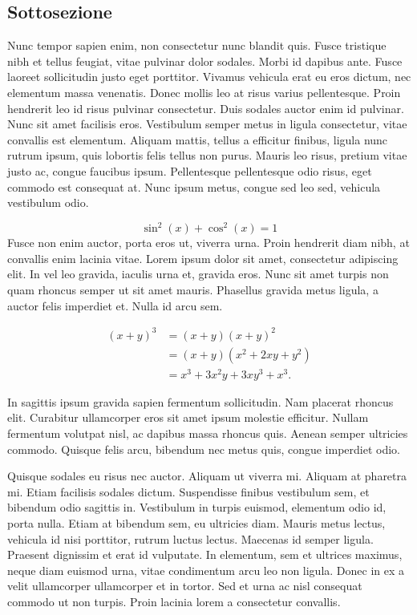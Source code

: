 \subsection{Sottosezione}
Nunc tempor sapien enim, non consectetur nunc blandit quis. Fusce tristique nibh et tellus feugiat, vitae pulvinar dolor sodales. Morbi id dapibus ante. Fusce laoreet sollicitudin justo eget porttitor. Vivamus vehicula erat eu eros dictum, nec elementum massa venenatis. Donec mollis leo at risus varius pellentesque. Proin hendrerit leo id risus pulvinar consectetur. Duis sodales auctor enim id pulvinar. Nunc sit amet facilisis eros. Vestibulum semper metus in ligula consectetur, vitae convallis est elementum. Aliquam mattis, tellus a efficitur finibus, ligula nunc rutrum ipsum, quis lobortis felis tellus non purus. Mauris leo risus, pretium vitae justo ac, congue faucibus ipsum. Pellentesque pellentesque odio risus, eget commodo est consequat at. Nunc ipsum metus, congue sed leo sed, vehicula vestibulum odio.

\begin{equation}\label{eq:fund_trigon_eq_1}
\sin^2(x) + \cos^2(x) = 1
\end{equation}
Fusce non enim auctor, porta eros ut, viverra urna. Proin hendrerit diam nibh, at convallis enim lacinia vitae. Lorem ipsum dolor sit amet, consectetur adipiscing elit. In vel leo gravida, iaculis urna et, gravida eros. Nunc sit amet turpis non quam rhoncus semper ut sit amet mauris. Phasellus gravida metus ligula, a auctor felis imperdiet et. Nulla id arcu sem.

\begin{align}				%
(x+y)^3&=(x+y)(x+y)^2\\
&=(x+y)(x^2+2xy+y^2)\\		%
&=x^3+3x^2y+3xy^3+x^3.
\end{align}

In sagittis ipsum gravida sapien fermentum sollicitudin. Nam placerat rhoncus elit. Curabitur ullamcorper eros sit amet ipsum molestie efficitur. Nullam fermentum volutpat nisl, ac dapibus massa rhoncus quis. Aenean semper ultricies commodo. Quisque felis arcu, bibendum nec metus quis, congue imperdiet odio.

Quisque sodales eu risus nec auctor. Aliquam ut viverra mi. Aliquam at pharetra mi. Etiam facilisis sodales dictum. Suspendisse finibus vestibulum sem, et bibendum odio sagittis in. Vestibulum in turpis euismod, elementum odio id, porta nulla. Etiam at bibendum sem, eu ultricies diam. Mauris metus lectus, vehicula id nisi porttitor, rutrum luctus lectus. Maecenas id semper ligula. Praesent dignissim et erat id vulputate. In elementum, sem et ultrices maximus, neque diam euismod urna, vitae condimentum arcu leo non ligula. Donec in ex a velit ullamcorper ullamcorper et in tortor. Sed et urna ac nisl consequat commodo ut non turpis. Proin lacinia lorem a consectetur convallis.


